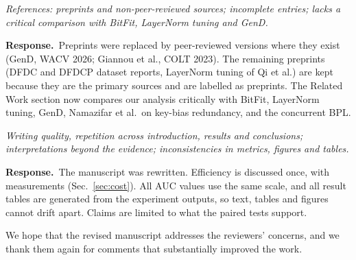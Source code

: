 \documentclass[11pt]{article}
\newenvironment{comment}{\par\medskip\noindent\begin{minipage}{\linewidth}\color{black!70}\itshape}{\end{minipage}\par\smallskip}
\newcommand{\resp}{\noindent\textbf{Response.}~}
\begin{document}
\begin{comment}
References: preprints and non-peer-reviewed sources; incomplete entries; lacks a critical comparison with BitFit, LayerNorm tuning and GenD.
\end{comment}
\resp Preprints were replaced by peer-reviewed versions where they exist (GenD, WACV 2026; Giannou et al., COLT 2023). The remaining preprints (DFDC and DFDCP dataset reports, LayerNorm tuning of Qi et al.) are kept because they are the primary sources and are labelled as preprints. The Related Work section now compares our analysis critically with BitFit, LayerNorm tuning, GenD, Namazifar et al.\ on key-bias redundancy, and the concurrent BPL.

\begin{comment}
Writing quality, repetition across introduction, results and conclusions; interpretations beyond the evidence; inconsistencies in metrics, figures and tables.
\end{comment}
\resp The manuscript was rewritten. Efficiency is discussed once, with measurements (Sec.~\ref{sec:cost}). All AUC values use the same scale, and all result tables are generated from the experiment outputs, so text, tables and figures cannot drift apart. Claims are limited to what the paired tests support.

\bigskip
\noindent We hope that the revised manuscript addresses the reviewers' concerns, and we thank them again for comments that substantially improved the work.
\end{document}
